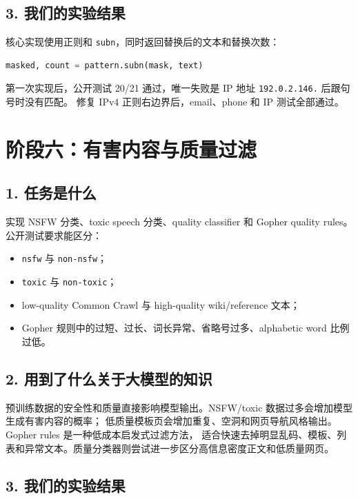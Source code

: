 \documentclass[UTF8,11pt]{ctexart}
\begin{document}
\subsection*{3. 我们的实验结果}

核心实现使用正则和 \texttt{subn}，同时返回替换后的文本和替换次数：

\begin{lstlisting}[language=Python]
masked, count = pattern.subn(mask, text)
\end{lstlisting}

第一次实现后，公开测试 20/21 通过，唯一失败是 IP 地址 \texttt{192.0.2.146.} 后跟句号时没有匹配。
修复 IPv4 正则右边界后，email、phone 和 IP 测试全部通过。

\section{阶段六：有害内容与质量过滤}

\subsection*{1. 任务是什么}

实现 NSFW 分类、toxic speech 分类、quality classifier 和 Gopher quality rules。
公开测试要求能区分：

\begin{itemize}
  \item \texttt{nsfw} 与 \texttt{non-nsfw}；
  \item \texttt{toxic} 与 \texttt{non-toxic}；
  \item low-quality Common Crawl 与 high-quality wiki/reference 文本；
  \item Gopher 规则中的过短、过长、词长异常、省略号过多、alphabetic word 比例过低。
\end{itemize}

\subsection*{2. 用到了什么关于大模型的知识}

预训练数据的安全性和质量直接影响模型输出。NSFW/toxic 数据过多会增加模型生成有害内容的概率；
低质量模板页会增加重复、空洞和网页导航风格输出。Gopher rules 是一种低成本启发式过滤方法，
适合快速去掉明显乱码、模板、列表和异常文本。质量分类器则尝试进一步区分高信息密度正文和低质量网页。

\subsection*{3. 我们的实验结果}
\end{document}
